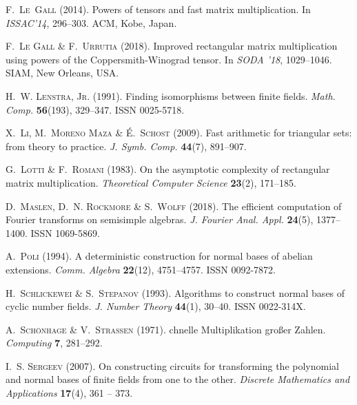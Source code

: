 \begin{thebibliography}{36}
\textsc{F.~Le~Gall} (2014).
\newblock Powers of tensors and fast matrix multiplication.
\newblock In \emph{ISSAC'14}, 296--303. ACM, Kobe, Japan.

\textsc{F.~{Le Gall}} \& \textsc{F.~Urrutia} (2018).
\newblock Improved rectangular matrix multiplication using powers of the
  {C}oppersmith-{W}inograd tensor.
\newblock In \emph{SODA '18}, 1029--1046. SIAM, New Orleans, USA.

\textsc{H.~W. Lenstra, Jr.} (1991).
\newblock Finding isomorphisms between finite fields.
\newblock \emph{Math. Comp.} \textbf{56}(193), 329--347.
\newblock ISSN 0025-5718.

\textsc{X.~Li}, \textsc{M.~{Moreno Maza}} \& \textsc{{\'E}.~Schost} (2009).
\newblock Fast arithmetic for triangular sets: from theory to practice.
\newblock \emph{J. Symb. Comp.} \textbf{44}(7), 891--907.

\textsc{G.~Lotti} \& \textsc{F.~Romani} (1983).
\newblock On the asymptotic complexity of rectangular matrix multiplication.
\newblock \emph{Theoretical Computer Science} \textbf{23}(2), 171--185.

\textsc{D.~Maslen}, \textsc{D.~N. Rockmore} \& \textsc{S.~Wolff} (2018).
\newblock The efficient computation of {F}ourier transforms on semisimple
  algebras.
\newblock \emph{J. Fourier Anal. Appl.} \textbf{24}(5), 1377--1400.
\newblock ISSN 1069-5869.

\textsc{A.~Poli} (1994).
\newblock A deterministic construction for normal bases of abelian extensions.
\newblock \emph{Comm. Algebra} \textbf{22}(12), 4751--4757.
\newblock ISSN 0092-7872.

\textsc{H.~Schlickewei} \& \textsc{S.~Stepanov} (1993).
\newblock Algorithms to construct normal bases of cyclic number fields.
\newblock \emph{J. Number Theory} \textbf{44}(1), 30--40.
\newblock ISSN 0022-314X.

\textsc{A.~Sch\"onhage} \& \textsc{V.~Strassen} (1971).
chnelle {M}ultiplikation gro\ss er {Z}ahlen.
\newblock \emph{Computing} \textbf{7}, 281--292.

\textsc{I.~S. Sergeev} (2007).
\newblock On constructing circuits for transforming the polynomial and normal
  bases of finite fields from one to the other.
\newblock \emph{Discrete Mathematics and Applications} \textbf{17}(4), 361 --
  373.


\end{thebibliography}
